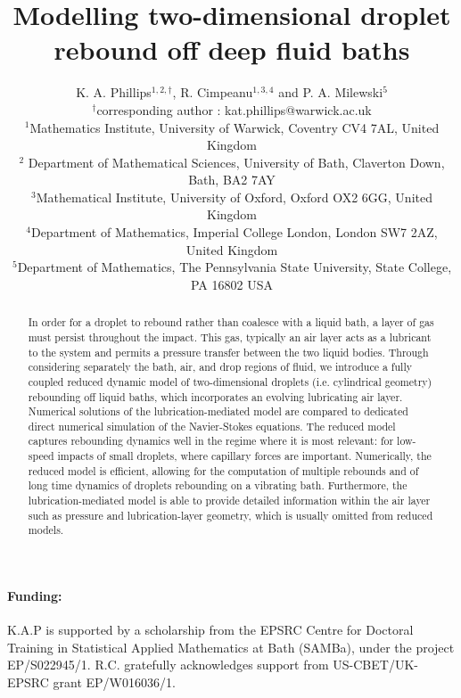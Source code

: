 \documentclass[11pt]{article}
\title{Modelling two-dimensional droplet rebound off deep fluid baths}
\author{
K. A. Phillips$^{1,2,\dagger}$, R. Cimpeanu$^{1,3,4}$  and P. A. Milewski$^{5}$ \\
\And 
$^\dagger$corresponding author : kat.phillips@warwick.ac.uk \\
$^{1}$Mathematics Institute, University of Warwick, Coventry CV4 7AL, United Kingdom\\
$^{2}$ Department of Mathematical Sciences, University of Bath, Claverton Down, Bath, BA2 7AY \\
$^{3}$Mathematical Institute, University of Oxford, Oxford OX2 6GG, United Kingdom\\
$^{4}$Department of Mathematics, Imperial College London, London SW7 2AZ, United Kingdom\\
$^{5}$Department of Mathematics, The Pennsylvania State University, State College, PA 16802
USA
}
\date{}
\begin{document}
\maketitle
\begin{abstract}
In order for a droplet to rebound rather than coalesce with a liquid bath, a layer of gas must persist throughout the impact. This gas, typically an air layer acts as a lubricant to the system and permits a pressure transfer between the two liquid bodies. Through considering separately the bath, air, and drop regions of fluid, we introduce a fully coupled reduced dynamic model of two-dimensional droplets (i.e. cylindrical geometry) rebounding off liquid baths, which incorporates an evolving lubricating air layer. Numerical solutions of the lubrication-mediated model are compared to dedicated direct numerical simulation of the Navier-Stokes equations. The reduced model captures rebounding dynamics well in the regime where it is most relevant: for low-speed impacts of small droplets, where capillary forces are important. Numerically, the reduced model is efficient, allowing for the computation of multiple rebounds and of long time dynamics of droplets rebounding on a vibrating bath. Furthermore, the lubrication-mediated model is able to provide detailed information within the air layer such as pressure and lubrication-layer geometry, which is usually omitted from reduced models.
\end{abstract}







%


\paragraph{Funding:}K.A.P is supported by a scholarship from the EPSRC Centre for Doctoral Training in Statistical Applied Mathematics at Bath (SAMBa), under the project EP/S022945/1. R.C. gratefully acknowledges support from US-CBET/UK-EPSRC grant EP/W016036/1.





\end{document}
